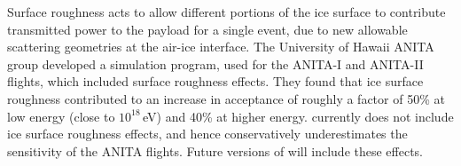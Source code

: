 Surface roughness acts to allow different portions of the ice surface to contribute transmitted power to the payload for a single event, due to new allowable scattering geometries at the air-ice interface.
The University of Hawaii ANITA group developed a simulation program, used for the ANITA-I and ANITA-II flights, which included surface roughness effects. They found that ice surface roughness contributed to an increase in acceptance of roughly a factor of 50\% at low energy (close to $10^{18}$\,eV) and 40\% at higher energy.
\icemc currently does not include ice surface roughness effects, and hence conservatively underestimates the sensitivity of the ANITA flights. Future versions of \icemc will include these effects.



